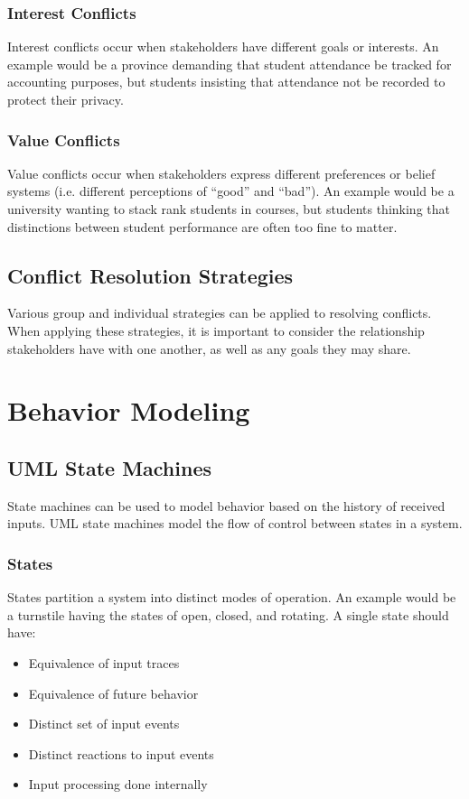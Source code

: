 \documentclass[12pt,titlepage]{article}
\let\stdsection\section
\renewcommand\section{\clearpage\stdsection}
\begin{document}
      \subsubsection{Interest Conflicts}
        Interest conflicts occur when stakeholders have different goals or interests. An example would be a province demanding that student
        attendance be tracked for accounting purposes, but students insisting that attendance not be recorded to protect their privacy.

      \subsubsection{Value Conflicts}
        Value conflicts occur when stakeholders express different preferences or belief systems (i.e. different perceptions of ``good'' and ``bad'').
        An example would be a university wanting to stack rank students in courses, but students thinking that distinctions between student
        performance are often too fine to matter.

    \subsection{Conflict Resolution Strategies}
      Various group and individual strategies can be applied to resolving conflicts. When applying these strategies, it is important to consider
      the relationship stakeholders have with one another, as well as any goals they may share.

  \section{Behavior Modeling}

    \subsection{UML State Machines}
      State machines can be used to model behavior based on the history of received inputs. UML state machines model the flow of control between
      states in a system.

      \subsubsection{States}
        States partition a system into distinct modes of operation. An example would be a turnstile having the states of open, closed, and rotating.
        A single state should have:
        \begin{itemize}
          \item Equivalence of input traces
          \item Equivalence of future behavior
          \item Distinct set of input events
          \item Distinct reactions to input events
          \item Input processing done internally
        \end{itemize}
\end{document}
